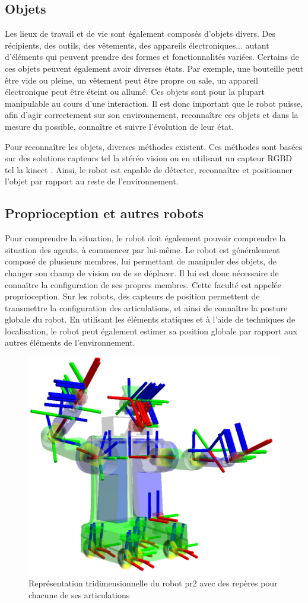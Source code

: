 \documentclass[a4paper,11pt,twoside]{StyleThese}
\begin{document}
\subsection{Objets}
Les lieux de travail et de vie sont également composés d'objets divers. Des récipients, des outils, des vêtements, des appareils électroniques... autant d'éléments qui peuvent prendre des formes et fonctionnalités variées.
Certains de ces objets peuvent également avoir diverses états. Par exemple, une bouteille peut être vide ou pleine, un vêtement peut être propre ou sale, un appareil électronique peut être éteint ou allumé.
Ces objets sont pour la plupart manipulable au cours d'une interaction. Il est donc important que le robot puisse, afin d'agir correctement sur son environnement, reconnaître ces objets et dans la mesure du possible, connaître et suivre l'évolution de leur état.

Pour reconnaître les objets, diverses méthodes existent. Ces méthodes sont basées sur des solutions capteurs tel la stéréo vision \cite{murphy2005}
ou en utilisant un capteur RGBD tel la kinect \cite{tang2012}.
Ainsi, le robot est capable de détecter, reconnaître et positionner l'objet par rapport au reste de l'environnement.


\subsection{Proprioception et autres robots}
Pour comprendre la situation, le robot doit également pouvoir comprendre la situation des agents, à commencer par lui-même. Le robot est généralement composé de plusieurs membres, lui permettant de manipuler des objets, de changer son champ de vision ou de se déplacer. Il lui est donc nécessaire de connaître la configuration de ses propres membres. Cette faculté est appelée proprioception. Sur les robots, des capteurs de position permettent de transmettre la configuration des articulations, et ainsi de connaître la posture globale du robot. En utilisant les éléments statiques et à l'aide de techniques de localisation,
le robot peut également estimer sa position globale par rapport aux autres éléments de l'environnement.

\begin{figure}[ht!]
 \centering
  \includegraphics[width=0.59\linewidth]{./img/frames2.png} 
  \caption {Représentation tridimensionnelle du robot pr2 avec des repères pour chacune de ses articulations}
  \label{fig:frames}
\end{figure}
\end{document}
